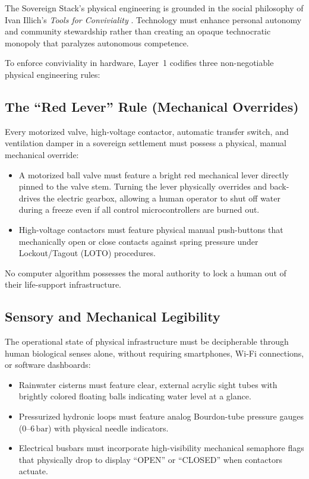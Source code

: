 The Sovereign Stack's physical engineering is grounded in the social philosophy of Ivan Illich's \textit{Tools for Conviviality} \cite{illich1973conviviality}. Technology must enhance personal autonomy and community stewardship rather than creating an opaque technocratic monopoly that paralyzes autonomous competence.

To enforce conviviality in hardware, Layer~1 codifies three non-negotiable physical engineering rules:

\subsection{The ``Red Lever'' Rule (Mechanical Overrides)}

Every motorized valve, high-voltage contactor, automatic transfer switch, and ventilation damper in a sovereign settlement must possess a physical, manual mechanical override:
\begin{itemize}
    \item A motorized ball valve must feature a bright red mechanical lever directly pinned to the valve stem. Turning the lever physically overrides and back-drives the electric gearbox, allowing a human operator to shut off water during a freeze even if all control microcontrollers are burned out.
    \item High-voltage contactors must feature physical manual push-buttons that mechanically open or close contacts against spring pressure under Lockout/Tagout (LOTO) procedures.
\end{itemize}
No computer algorithm possesses the moral authority to lock a human out of their life-support infrastructure.

\subsection{Sensory and Mechanical Legibility}

The operational state of physical infrastructure must be decipherable through human biological senses alone, without requiring smartphones, Wi-Fi connections, or software dashboards:
\begin{itemize}
    \item Rainwater cisterns must feature clear, external acrylic sight tubes with brightly colored floating balls indicating water level at a glance.
    \item Pressurized hydronic loops must feature analog Bourdon-tube pressure gauges ($0$--$6\,\mathrm{bar}$) with physical needle indicators.
    \item Electrical busbars must incorporate high-visibility mechanical semaphore flags that physically drop to display ``OPEN'' or ``CLOSED'' when contactors actuate.
\end{itemize}


